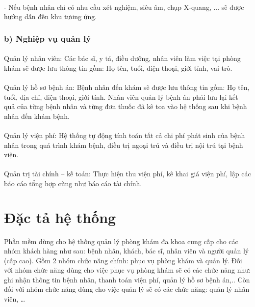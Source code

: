 \documentclass{report}
\begin{document}
	\paragraph{}
	-	Nếu bệnh nhân chỉ có nhu cầu xét nghiệm, siêu âm, chụp X-quang, ... sẽ được hướng dẫn đến khu tương ứng.

\subsubsection{b) Nghiệp vụ quản lý}
	\paragraph{}
	Quản lý nhân viên: Các bác sĩ, y tá, điều dưỡng, nhân viên làm việc tại phòng khám sẽ được lưu thông tin gồm: Họ tên, tuổi, điện thoại, giới tính, vai trò.
	\paragraph{}
	Quản lý hồ sơ bệnh án: Bệnh nhân đến khám sẽ được lưu thông tin gồm: Họ tên, tuổi, địa chỉ, điện thoại, giới tính. Nhân viên quản lý bệnh án phải lưu lại kết quả của từng bệnh nhân và từng đơn thuốc đã kê toa vào hệ thống sau khi bệnh nhân đến khám bệnh.
	\paragraph{}
	Quản lý viện phí: Hệ thống tự động tính toán tất cả chi phí phát sinh của bệnh nhân trong quá trình khám bệnh, điều trị ngoại trú và điều trị nội trú tại bệnh viện.
	\paragraph{}
	Quản trị tài chính – kế toán: Thực hiện thu viện phí, kê khai giá viện phí, lập các báo cáo tổng hợp cũng như báo cáo tài chính.

\section{ Đặc tả hệ thống}
	\paragraph{}
	Phần mềm dùng cho hệ thống quản lý phòng khám đa khoa cung cấp cho các nhóm khách hàng như sau: bệnh nhân, khách, bác sĩ, nhân viên và người quản lý (cấp cao). Gồm 2 nhóm chức năng chính: phục vụ phòng khám và quản lý. Đối với nhóm chức năng dùng cho việc phục vụ phòng khám sẽ có các chức năng như: ghi nhận thông tin bệnh nhân, thanh toán viện phí, quản lý hồ sơ bệnh án,.. Còn đối với nhóm chức năng dùng cho việc quản lý sẽ có các chức năng: quản lý nhân viên, …
	
\end{document}
